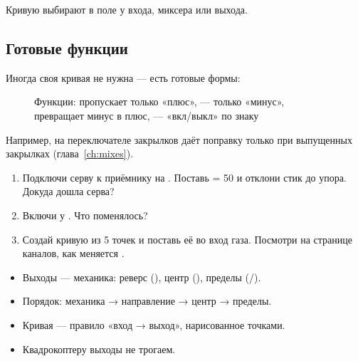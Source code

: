 Кривую выбирают в поле  у входа, миксера или выхода.

\subsection{Готовые функции}

Иногда своя кривая не нужна --- есть готовые формы:

\begin{figure}[H]
\centering
{}
\caption{Функции:  пропускает только «плюс»,  --- только «минус»,
 превращает минус в плюс,  --- «вкл/выкл» по знаку}
\end{figure}

Например,  на переключателе закрылков даёт поправку только при выпущенных
закрылках (глава~\ref{ch:mixes}).

\begin{tryit}
\begin{enumerate}
  \item Подключи серву к приёмнику на . Поставь  = 50 и отклони стик до
        упора. Докуда дошла серва?
  \item Включи  у . Что поменялось?
  \item Создай кривую из 5 точек и поставь её во вход газа. Посмотри на странице каналов,
        как меняется .
\end{enumerate}
\end{tryit}

\begin{summary}
\begin{itemize}
  \item Выходы --- механика: реверс (), центр (), пределы (/).
  \item Порядок: механика → направление → центр → пределы.
  \item Кривая --- правило «вход → выход», нарисованное точками.
  \item Квадрокоптеру выходы не трогаем.
\end{itemize}
\end{summary}
